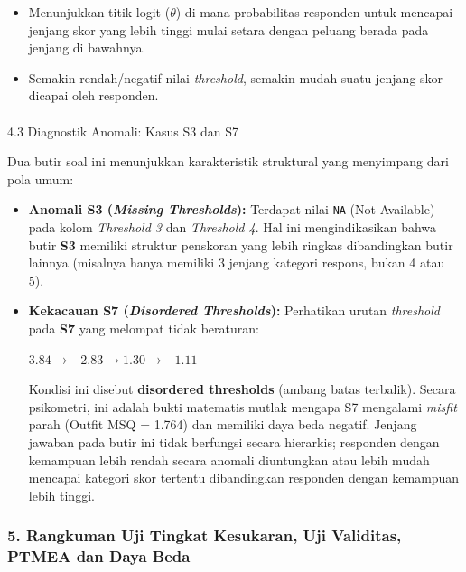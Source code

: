 \documentclass[
]{article}
\makeatletter
\let\oldparagraph\paragraph
\renewcommand{\paragraph}{
    \@ifstar
      \xxxParagraphStar
      \xxxParagraphNoStar
  }
\newcommand{\xxxParagraphStar}[1]{\oldparagraph*{#1}\mbox{}}
\newcommand{\xxxParagraphNoStar}[1]{\oldparagraph{#1}\mbox{}}
\makeatother
\begin{document}
\begin{itemize}
\item
  Menunjukkan titik logit (\(\theta\)) di mana probabilitas responden
  untuk mencapai jenjang skor yang lebih tinggi mulai setara dengan
  peluang berada pada jenjang di bawahnya.
\item
  Semakin rendah/negatif nilai \emph{threshold}, semakin mudah suatu
  jenjang skor dicapai oleh responden.
\end{itemize}

\paragraph{4.3 Diagnostik Anomali: Kasus S3 dan
S7}\label{diagnostik-anomali-kasus-s3-dan-s7}

Dua butir soal ini menunjukkan karakteristik struktural yang menyimpang
dari pola umum:

\begin{itemize}
\item
  \textbf{Anomali S3 (\emph{Missing Thresholds}):} Terdapat nilai
  \texttt{NA} (Not Available) pada kolom \emph{Threshold 3} dan
  \emph{Threshold 4}. Hal ini mengindikasikan bahwa butir \textbf{S3}
  memiliki struktur penskoran yang lebih ringkas dibandingkan butir
  lainnya (misalnya hanya memiliki 3 jenjang kategori respons, bukan 4
  atau 5).
\item
  \textbf{Kekacauan S7 (\emph{Disordered Thresholds}):} Perhatikan
  urutan \emph{threshold} pada \textbf{S7} yang melompat tidak
  beraturan:

  \(3.84 \rightarrow -2.83 \rightarrow 1.30 \rightarrow -1.11\)

  Kondisi ini disebut \textbf{disordered thresholds} (ambang batas
  terbalik). Secara psikometri, ini adalah bukti matematis mutlak
  mengapa S7 mengalami \emph{misfit} parah (Outfit MSQ = 1.764) dan
  memiliki daya beda negatif. Jenjang jawaban pada butir ini tidak
  berfungsi secara hierarkis; responden dengan kemampuan lebih rendah
  secara anomali diuntungkan atau lebih mudah mencapai kategori skor
  tertentu dibandingkan responden dengan kemampuan lebih tinggi.
\end{itemize}

\subsubsection{5. Rangkuman Uji Tingkat Kesukaran, Uji Validitas, PTMEA
dan Daya
Beda}\label{rangkuman-uji-tingkat-kesukaran-uji-validitas-ptmea-dan-daya-beda}
\end{document}
